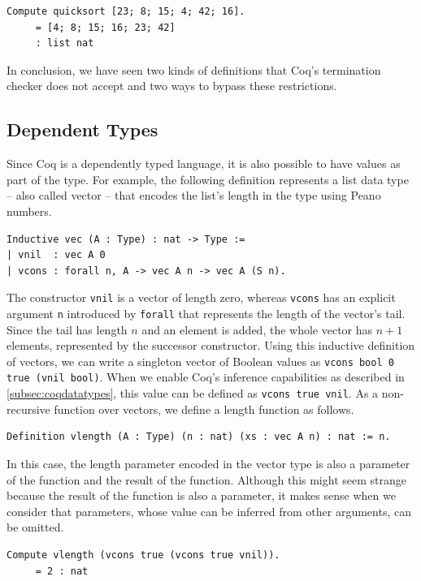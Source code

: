 \documentclass[a4paper, 11pt, fleqn, twoside]{scrreprt}
\newcommand{\cinl}[1]{\texttt{#1}}
\begin{document}
\begin{verbatim}
Compute quicksort [23; 8; 15; 4; 42; 16].
     = [4; 8; 15; 16; 23; 42]
     : list nat
\end{verbatim}

In conclusion, we have seen two kinds of definitions that Coq's termination checker does not accept and two ways to bypass these restrictions.

\subsection{Dependent Types}
\label{subsec:dependent}

Since Coq is a dependently typed language, it is also possible to have values as part of the type.
For example, the following definition represents a list data type -- also called vector -- that encodes the list's length in the type using Peano numbers.

\begin{verbatim}
Inductive vec (A : Type) : nat -> Type :=
| vnil  : vec A 0
| vcons : forall n, A -> vec A n -> vec A (S n).
\end{verbatim}

The constructor \cinl{vnil} is a vector of length zero, whereas \cinl{vcons} has an explicit argument \cinl{n} introduced by \cinl{forall} that represents the length of the vector's tail.
Since the tail has length $n$ and an element is added, the whole vector has $n + 1$ elements, represented by the successor constructor.
Using this inductive definition of vectors, we can write a singleton vector of Boolean values as \cinl{vcons bool 0 true (vnil bool)}.
When we enable Coq's inference capabilities as described in \autoref{subsec:coqdatatypes}, this value can be defined as \cinl{vcons true vnil}.
As a non-recursive function over vectors, we define a length function as follows.

\begin{verbatim}
Definition vlength (A : Type) (n : nat) (xs : vec A n) : nat := n.
\end{verbatim}

In this case, the length parameter encoded in the vector type is also a parameter of the function and the result of the function.
Although this might seem strange because the result of the function is also a parameter, it makes sense when we consider that parameters, whose value can be inferred from other arguments, can be omitted.

\begin{verbatim}
Compute vlength (vcons true (vcons true vnil)).
     = 2 : nat
\end{verbatim}
\end{document}
